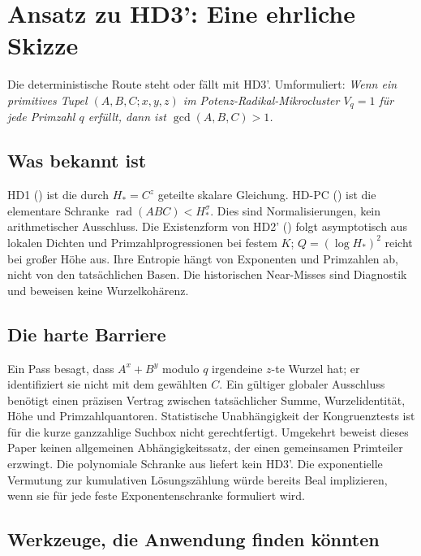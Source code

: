 \documentclass[11pt,a4paper]{article}
\DeclareMathOperator{\rad}{rad}
\begin{document}
\section{Ansatz zu HD3': Eine ehrliche Skizze}
\label{sec:hd3-approach}

Die deterministische Route steht oder fällt mit HD3'. Umformuliert: \emph{Wenn ein primitives Tupel $(A,B,C;x,y,z)$ im Potenz-Radikal-Mikrocluster $V_q = 1$ für jede Primzahl $q$ erfüllt, dann ist $\gcd(A,B,C) > 1$.}

\subsection*{Was bekannt ist}

HD1 () ist die durch $H_*=C^z$ geteilte skalare
Gleichung. HD-PC () ist die elementare
Schranke $\rad(ABC)<H_*^\sigma$. Dies sind Normalisierungen,
kein arithmetischer Ausschluss. Die Existenzform von HD2'
() folgt asymptotisch aus lokalen Dichten und
Primzahlprogressionen bei festem $K$; $Q=(\log H_*)^2$ reicht bei
großer Höhe aus. Ihre Entropie hängt von Exponenten und Primzahlen
ab, nicht von den tatsächlichen Basen. Die historischen Near-Misses
sind Diagnostik und beweisen keine Wurzelkohärenz.

\subsection*{Die harte Barriere}

Ein Pass besagt, dass $A^x+B^y$ modulo $q$ irgendeine $z$-te
Wurzel hat; er identifiziert sie nicht mit dem gewählten $C$.
Ein gültiger globaler Ausschluss benötigt einen präzisen Vertrag
zwischen tatsächlicher Summe, Wurzelidentität, Höhe und Primzahlquantoren.
Statistische Unabhängigkeit der Kongruenztests ist für die kurze
ganzzahlige Suchbox nicht gerechtfertigt. Umgekehrt beweist dieses
Paper keinen allgemeinen Abhängigkeitssatz, der einen gemeinsamen
Primteiler erzwingt. Die polynomiale Schranke aus 
liefert kein HD3'. Die exponentielle Vermutung zur kumulativen
Lösungszählung  würde bereits Beal implizieren,
wenn sie für jede feste Exponentenschranke formuliert wird.

\subsection*{Werkzeuge, die Anwendung finden könnten}
\end{document}
